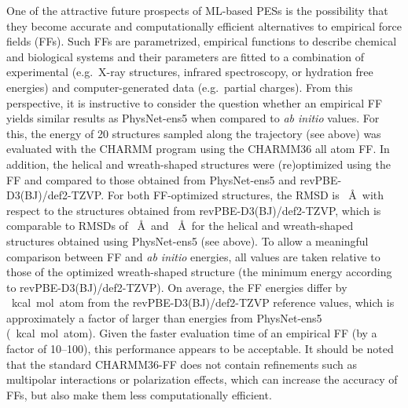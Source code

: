 \documentclass[12pt]{article}
\newcommand{\nn}{PhysNet}
\begin{document}
One of the attractive future prospects of ML-based PESs is the
possibility that they become accurate and computationally efficient
alternatives\cite{chmiela2017machine} to empirical force fields (FFs).
Such FFs are parametrized, empirical functions to describe chemical
and biological systems and their parameters are fitted to a
combination of experimental (e.g.\ X-ray structures, infrared
spectroscopy, or hydration free energies) and computer-generated data
(e.g.\ partial charges).\cite{mackerell2004} From this perspective, it
is instructive to consider the question whether an empirical FF yields
similar results as \nn-ens5 when compared to \textit{ab initio}
values. For this, the energy of 20 structures sampled along the
trajectory (see above) was evaluated with the CHARMM
program\cite{brooks1983charmm} using the CHARMM36 all atom
FF.\cite{best2012optimization} In addition, the helical and
wreath-shaped structures were (re)optimized using the FF and compared
to those obtained from \nn-ens5 and revPBE-D3(BJ)/def2-TZVP. For both
FF-optimized structures, the RMSD is ~\AA\ with respect to the
structures obtained from revPBE-D3(BJ)/def2-TZVP, which is comparable
to RMSDs of ~\AA\ and ~\AA\ for the helical and
wreath-shaped structures obtained using \nn-ens5 (see above). To allow
a meaningful comparison between FF and \textit{ab initio} energies,
all values are taken relative to those of the optimized wreath-shaped
structure (the minimum energy according to
revPBE-D3(BJ)/def2-TZVP). On average, the FF energies differ by
~kcal~mol~atom from the revPBE-D3(BJ)/def2-TZVP
reference values, which is approximately a factor of  larger than
energies from \nn-ens5 (~kcal~mol~atom). Given
the faster evaluation time of an empirical FF (by a factor of
10--100), this performance appears to be acceptable. It
should be noted that the standard CHARMM36-FF does not contain
refinements such as multipolar
interactions\cite{stone1981distributed,kramer2012atomic} or
polarization effects,\cite{lamoureux2003simple} which can increase the
accuracy of FFs, but also make them less computationally efficient.
\end{document}
